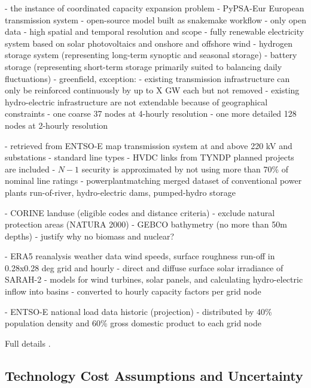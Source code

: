 - the instance of coordinated capacity expansion problem
- PyPSA-Eur European transmission system \cite{pypsaeur} \cite{hoersch_spatial_2017} 
- open-source model built as snakemake workflow \cite{snakemake}
- only open data
- high spatial and temporal resolution and scope
- fully renewable electricity system based on solar photovoltaics and onshore and offshore wind
- hydrogen storage system (representing long-term synoptic and seasonal storage)
- battery storage (representing short-term storage primarily suited to balancing daily fluctuations)
- greenfield, exception:
  - existing transmission infrastructure can only be reinforced continuously by up to X GW each but not removed
  - existing hydro-electric infrastructure are not extendable because of geographical constraints
- one coarse 37 nodes at 4-hourly resolution
- one more detailed 128 nodes at 2-hourly resolution


- retrieved from ENTSO-E map transmission system at and above 220 kV and substations
- standard line types
- HVDC links from TYNDP planned projects are included
- $N-1$ security is approximated by not using more than 70\% of nominal line ratings
- powerplantmatching merged dataset of conventional power plants
  run-of-river, hydro-electric dams, pumped-hydro storage


- CORINE landuse (eligible codes and distance criteria)
- exclude natural protection areas (NATURA 2000)
- GEBCO bathymetry (no more than 50m depths)
- justify why no biomass and nuclear?


- ERA5 reanalysis weather data wind speeds, surface roughness run-off in 0.28x0.28 deg grid and hourly
- direct and diffuse surface solar irradiance of SARAH-2
- models for wind turbines, solar panels, and calculating hydro-electric inflow into basins
- converted to hourly capacity factors per grid node


- ENTSO-E national load data historic (projection)
- distributed by 40\% population density and 60\% gross domestic product to each grid node

Full details \cite{pypsaeur}.

\subsection{Technology Cost Assumptions and Uncertainty}
\label{sec:uncertainty}

